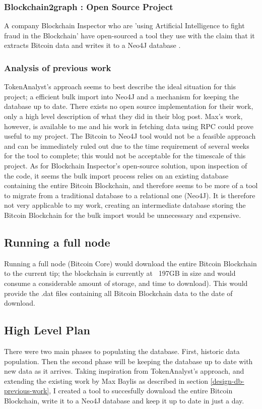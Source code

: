 \subsubsection{Blockchain2graph : Open Source Project}
A company Blockchain Inspector who are 'using Artificial Intelligence to fight fraud in the Blockchain' have open-sourced a tool they use with the claim that it extracts Bitcoin data and writes it to a Neo4J database \cite{RefWorks:doc:5cac6184e4b01c076c63e173}.

\subsubsection{Analysis of previous work}
TokenAnalyst's approach seems to best describe the ideal situation for this project; a efficient bulk import into Neo4J and a mechanism for keeping the database up to date. There exists no open source implementation for their work, only a high level description of what they did in their blog post. Max's work, however, is available to me and his work in fetching data using RPC could prove useful to my project. The Bitcoin to Neo4J tool would not be a feasible approach and can be immediately ruled out due to the time requirement of several weeks for the tool to complete; this would not be acceptable for the timescale of this project. As for Blockchain Inspector's open-source solution, upon inspection of the code, it seems the bulk import process relies on an existing database containing the entire Bitcoin Blockchain, and therefore seems to be more of a tool to migrate from a traditional database to a relational one (Neo4J). It is therefore not very applicable to my work, creating an intermediate database storing the Bitcoin Blockchain for the bulk import would be unnecessary and expensive. 

\subsection{Running a full node}
Running a full node (Bitcoin Core) would download the entire Bitcoin Blockchain to the current tip; the blockchain is currently at ~197GB\cite{RefWorks:doc:5c6ab1a3e4b05e3aaec0ffc8} in size and would consume a considerable amount of storage, and time to download). This would provide the .dat files containing all Bitcoin Blockchain data to the date of download. 

\subsection{High Level Plan}
There were two main phases to populating the database. First, historic data population. Then the second phase will be keeping the database up to date with new data as it arrives. Taking inspiration from TokenAnalyst's approach, and extending the existing work by Max Baylis as described in section \ref{design-db-previous-work}, I created a tool to succesfully download the entire Bitcoin Blockchain, write it to a Neo4J database and keep it up to date in just a day.

